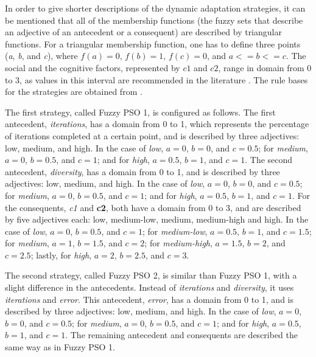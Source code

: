 In order to give shorter descriptions of the dynamic adaptation strategies, it can be mentioned that all of the membership functions (the fuzzy sets that describe an adjective of an antecedent or a consequent) are described by triangular functions. For a triangular membership function, one has to define three points (\textit{a}, \textit{b}, and \textit{c}), where $f(a) = 0$, $f(b) = 1$, $f(c) = 0$, and $a <= b <= c$. The social and the cognitive factors, represented by $c1$ and $c2$, range in domain from 0 to 3, as values in this interval are recommended in the literature \cite{kenndy1995particle}. The rule bases for the strategies are obtained from \cite{melin2013optimal}.

The first strategy, called Fuzzy PSO 1, is configured as follows. The first antecedent, \textit{iterations}, has a domain from 0 to 1, which represents the percentage of iterations completed at a certain point, and is described by three adjectives: low, medium, and high. In the case of \textit{low}, $a = 0$, $b = 0$, and $c = 0.5$; for \textit{medium}, $a = 0$, $b = 0.5$, and $c = 1$; and for \textit{high}, $a = 0.5$, $b = 1$, and $c = 1$. The second antecedent, \textit{diversity}, has a domain from 0 to 1, and is described by three adjectives: low, medium, and high. In the case of \textit{low}, $a = 0$, $b = 0$, and $c = 0.5$; for \textit{medium}, $a = 0$, $b = 0.5$, and $c = 1$; and for \textit{high}, $a = 0.5$, $b = 1$, and $c = 1$. For the consequents, \textit{c1} and \textbf{c2}, both have a domain from 0 to 3, and are described by five adjectives each: low, medium-low, medium, medium-high and high. In the case of \textit{low}, $a = 0$, $b = 0.5$, and $c = 1$; for \textit{medium-low}, $a = 0.5$, $b = 1$, and $c = 1.5$; for \textit{medium}, $a = 1$, $b = 1.5$, and $c = 2$; for \textit{medium-high}, $a = 1.5$, $b = 2$, and $c = 2.5$; lastly, for \textit{high}, $a = 2$, $b = 2.5$, and $c = 3$.

The second strategy, called Fuzzy PSO 2, is similar than Fuzzy PSO 1, with a slight difference in the antecedents. Instead of \textit{iterations} and \textit{diversity}, it uses \textit{iterations} and \textit{error}. This antecedent, \textit{error}, has a domain from 0 to 1, and is described by three adjectives: low, medium, and high. In the case of \textit{low}, $a = 0$, $b = 0$, and $c = 0.5$; for \textit{medium}, $a = 0$, $b = 0.5$, and $c = 1$; and for \textit{high}, $a = 0.5$, $b = 1$, and $c = 1$. The remaining antecedent and consequents are described the same way as in Fuzzy PSO 1.

